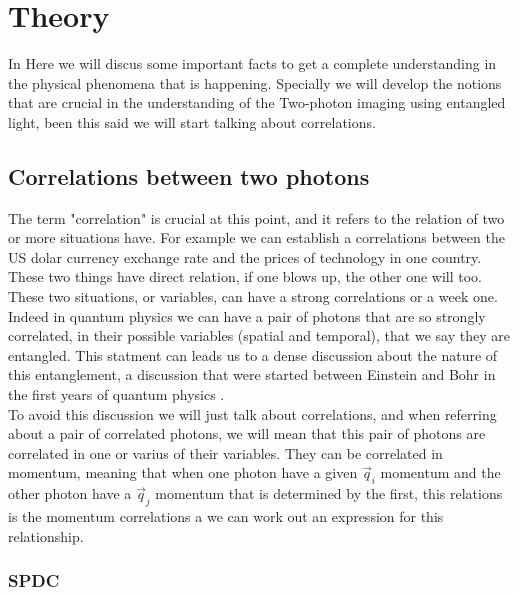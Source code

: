 
\chapter{Theory} %

\label{Chapter2} %

In Here we will discus some important facts to get a complete understanding 
in the physical phenomena that is happening. Specially we will develop the 
notions that are crucial in the understanding of the Two-photon imaging using entangled light, been this said 
we will start talking about correlations.

\section{Correlations between two photons}

The term "correlation" is crucial at this point, and it refers to the relation of two or more situations have. For example 
we can establish a correlations between the US dolar currency exchange rate and the prices of technology in one country. These two things have direct relation, if one blows up, the other one will too.
These two situations, or variables, can have a strong correlations or a week one. \\

Indeed in quantum physics we can have a pair of photons that are so strongly correlated, in their possible variables (spatial and temporal),
that we say they are entangled. This statment can leads us 
to a dense discussion about the nature of this entanglement, 
a discussion that were started between Einstein and Bohr in the first years of quantum physics \cite{einstein}.\\

To avoid this discussion we will just talk about correlations, 
and when referring about a pair of correlated photons, we will mean that 
this pair of photons are correlated in one or varius of their variables. 
They can be correlated in momentum, meaning that when one photon have a given $\vec{q}_i$ momentum 
and the other photon have a $\vec{q}_j$ momentum that is determined by the first, this relations is the momentum correlations a we can work out an expression for this relationship.
\subsection{SPDC}

